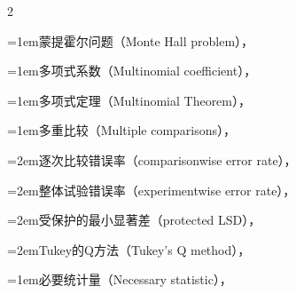 \begin{multicols}{2}
\par\addvspace{2pt}
\par\noindent\hangindent=1em\hspace*{0em}\label{idx:711}蒙提霍尔问题（Monte Hall problem），\hyperref[exercise:1.37]{\pageref*{exercise:1.37}}\par
\par\addvspace{2pt}
\par\noindent\hangindent=1em\hspace*{0em}\label{idx:712}多项式系数（Multinomial coefficient），\hyperref[idxocc:712:179]{\pageref*{idxocc:712:179}}\par
\par\addvspace{2pt}
\par\noindent\hangindent=1em\hspace*{0em}\label{idx:713}多项式定理（Multinomial Theorem），\hyperref[thm:4.6.4]{\pageref*{thm:4.6.4}}\par
\par\addvspace{2pt}
\par\noindent\hangindent=1em\hspace*{0em}\label{idx:714}多重比较（Multiple comparisons），\hyperref[sec:11.5.2]{\pageref*{sec:11.5.2}}\par
\par\noindent\hangindent=2em\hspace*{1em}\label{idx:715}逐次比较错误率（comparisonwise error rate），\hyperref[item:11.17.b]{\pageref*{item:11.17.b}}\par
\par\noindent\hangindent=2em\hspace*{1em}\label{idx:716}整体试验错误率（experimentwise error rate），\hyperref[item:11.17.b]{\pageref*{item:11.17.b}}\par
\par\noindent\hangindent=2em\hspace*{1em}\label{idx:717}受保护的最小显著差（protected LSD），\hyperref[exercise:11.17]{\pageref*{exercise:11.17}}\par
\par\noindent\hangindent=2em\hspace*{1em}\label{idx:718}Tukey的Q方法（Tukey’s Q method），\hyperref[idxocc:718:494]{\pageref*{idxocc:718:494}}\par
\par\addvspace{2pt}
\par\noindent\hangindent=1em\hspace*{0em}\label{idx:719}必要统计量（Necessary statistic），\hyperref[def:6.6.3]{\pageref*{def:6.6.3}}\par

\end{multicols}

